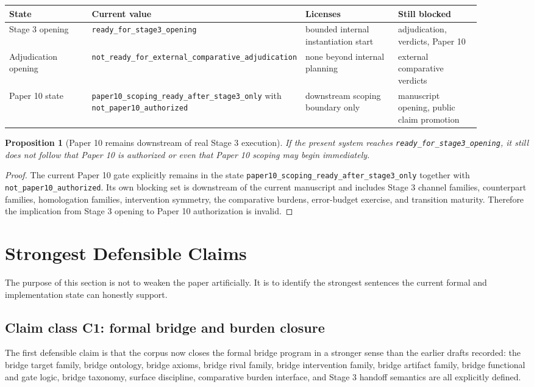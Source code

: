 \documentclass[11pt,a4paper]{article}
\newtheorem{proposition}[theorem]{Proposition}
\theoremstyle{definition}
\begin{document}
\begin{center}
\small
\begin{tabularx}{\linewidth}{@{}p{0.22\linewidth}p{0.2\linewidth}p{0.26\linewidth}p{0.22\linewidth}@{}}
\toprule
State & Current value & Licenses & Still blocked \\
\midrule
Stage 3 opening & \texttt{ready\_for\_stage3\_opening} & bounded internal instantiation start & adjudication, verdicts, Paper 10 \\
Adjudication opening & \texttt{not\_ready\_for\_external\_comparative\_adjudication} & none beyond internal planning & external comparative verdicts \\
Paper 10 state & \texttt{paper10\_scoping\_ready\_after\_stage3\_only} with \texttt{not\_paper10\_authorized} & downstream scoping boundary only & manuscript opening, public claim promotion \\
\bottomrule
\end{tabularx}
\end{center}

\begin{proposition}[Paper 10 remains downstream of real Stage 3 execution]
If the present system reaches \texttt{ready\_for\_stage3\_opening}, it still does not follow that Paper 10 is authorized or even that Paper 10 scoping may begin immediately.
\end{proposition}

\begin{proof}
The current Paper 10 gate explicitly remains in the state \texttt{paper10\_scoping\_ready\_after\_stage3\_only} together with \texttt{not\_paper10\_authorized}. Its own blocking set is downstream of the current manuscript and includes Stage 3 channel families, counterpart families, homologation families, intervention symmetry, the comparative burdens, error-budget exercise, and transition maturity. Therefore the implication from Stage 3 opening to Paper 10 authorization is invalid.
\end{proof}
\section{Strongest Defensible Claims}
The purpose of this section is not to weaken the paper artificially. It is to identify the strongest sentences the current formal and implementation state can honestly support.

\subsection{Claim class C1: formal bridge and burden closure}
The first defensible claim is that the corpus now closes the formal bridge program in a stronger sense than the earlier drafts recorded: the bridge target family, bridge ontology, bridge axioms, bridge rival family, bridge intervention family, bridge artifact family, bridge functional and gate logic, bridge taxonomy, surface discipline, comparative burden interface, and Stage 3 handoff semantics are all explicitly defined.
\end{document}
